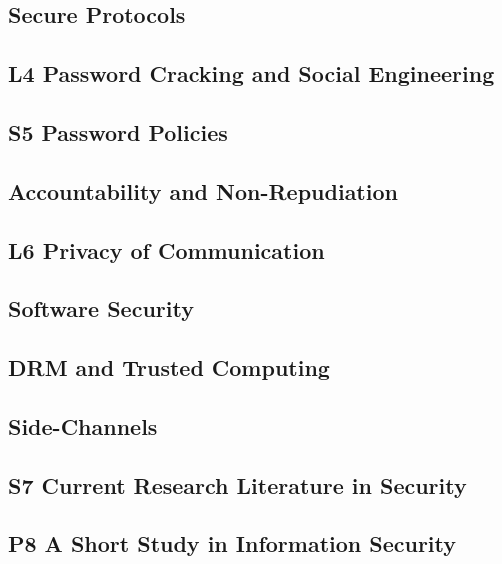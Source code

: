 \documentclass[a4paper]{llncs}
\begin{document}
\subsection{Secure Protocols}


\subsection{L4 Password Cracking and Social Engineering}


\subsection{S5 Password Policies}


\subsection{Accountability and Non-Repudiation}


\subsection{L6 Privacy of Communication}


\subsection{Software Security}


\subsection{DRM and Trusted Computing}


\subsection{Side-Channels}


\subsection{S7 Current Research Literature in Security}


\subsection{P8 A Short Study in Information Security}
\end{document}
